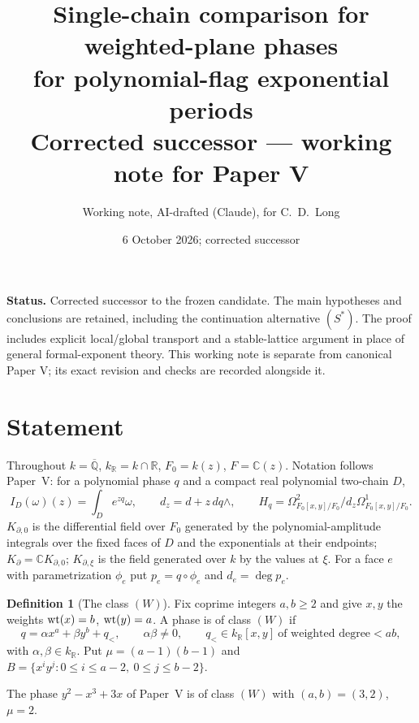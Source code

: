 \documentclass[11pt]{article}
\title{Single-chain comparison for weighted-plane phases\\ for polynomial-flag exponential periods\\[4pt]
\large Corrected successor --- working note for Paper V}
\author{Working note, AI-drafted (Claude), for C.~D.~Long}
\date{6 October 2026; corrected successor}
\numberwithin{equation}{section}
\theoremstyle{definition}
\newtheorem{definition}[theorem]{Definition}
\theoremstyle{remark}
\newcommand{\C}{\mathbb C}\newcommand{\Q}{\mathbb Q}\newcommand{\R}{\mathbb R}\newcommand{\Z}{\mathbb Z}
\newcommand{\Qbar}{\overline{\mathbb Q}}
\newcommand{\Hq}{H_q}
\begin{document}
\maketitle

\noindent\textbf{Status.} Corrected successor to the frozen candidate.
The main hypotheses and conclusions are retained, including the continuation
alternative $(S^*)$. The proof includes explicit local/global transport and a
stable-lattice argument in place of general formal-exponent theory.
This working note is separate from canonical Paper V; its exact revision
and checks are recorded alongside it.

\section{Statement}

Throughout $k=\Qbar$, $k_\R=k\cap\R$, $F_0=k(z)$, $F=\C(z)$. Notation follows
Paper~V: for a polynomial phase $q$ and a compact real polynomial two-chain $D$,
\[
 I_D(\omega)(z)=\int_D e^{zq}\omega,\qquad d_z=d+z\,dq\wedge,\qquad
 \Hq=\Omega^2_{F_0[x,y]/F_0}/d_z\Omega^1_{F_0[x,y]/F_0}.
\]
$K_{\partial,0}$ is the differential field over $F_0$ generated by the
polynomial-amplitude integrals over the fixed faces of $D$ and the
exponentials at their endpoints; $K_\partial=\C K_{\partial,0}$;
$K_{\partial,\xi}$ is the field generated over $k$ by the values at $\xi$.
For a face $e$ with parametrization $\phi_e$ put $p_e=q\circ\phi_e$ and
$d_e=\deg p_e$.

\begin{definition}[The class $(W)$]\label{def:W}
Fix coprime integers $a,b\ge2$ and give $x,y$ the weights $\operatorname{wt}(x)=b$,
$\operatorname{wt}(y)=a$. A phase is of class $(W)$ if
\[
 q=\alpha x^a+\beta y^b+q_<,\qquad \alpha\beta\ne0,\qquad
 q_<\in k_\R[x,y]\ \text{of weighted degree}<ab,
\]
with $\alpha,\beta\in k_\R$. Put $\mu=(a-1)(b-1)$ and
$B=\{x^iy^j:0\le i\le a-2,\ 0\le j\le b-2\}$.
\end{definition}

The phase $y^2-x^3+3x$ of Paper~V is of class $(W)$ with $(a,b)=(3,2)$, $\mu=2$.
\end{document}
